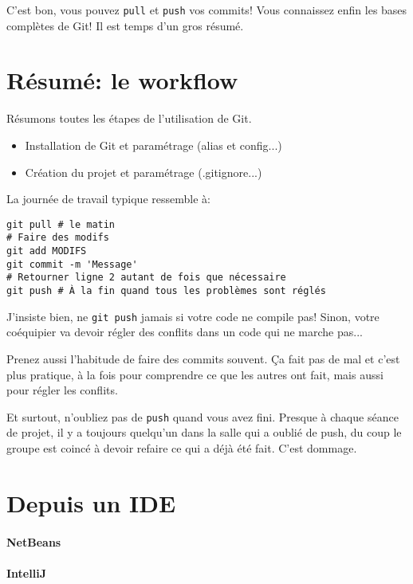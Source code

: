 \documentclass[10pt,a4paper]{article}
\begin{document}
C'est bon, vous pouvez {\tt pull} et {\tt push} vos commits! Vous connaissez enfin les bases complètes de Git! Il est temps d'un gros résumé.

\section{Résumé: le workflow}

Résumons toutes les étapes de l'utilisation de Git.

\begin{itemize}
\item Installation de Git et paramétrage (alias et config...)
\item Création du projet et paramétrage (.gitignore...)
\end{itemize}

La journée de travail typique ressemble à:

\begin{verbatim}
git pull # le matin
# Faire des modifs
git add MODIFS
git commit -m 'Message'
# Retourner ligne 2 autant de fois que nécessaire
git push # À la fin quand tous les problèmes sont réglés
\end{verbatim}

J'insiste bien, ne {\tt git push} jamais si votre code ne compile pas! Sinon, votre coéquipier va devoir régler des conflits dans un code qui ne marche pas...

Prenez aussi l'habitude de faire des commits souvent. Ça fait pas de mal et c'est plus pratique, à la fois pour comprendre ce que les autres ont fait, mais aussi pour régler les conflits.

Et surtout, n'oubliez pas de {\tt push} quand vous avez fini. Presque à chaque séance de projet, il y a toujours quelqu'un dans la salle qui a oublié de push, du coup le groupe est coincé à devoir refaire ce qui a déjà été fait. C'est dommage.

\section{Depuis un IDE}

\paragraph{NetBeans}

\paragraph{IntelliJ}
\end{document}
